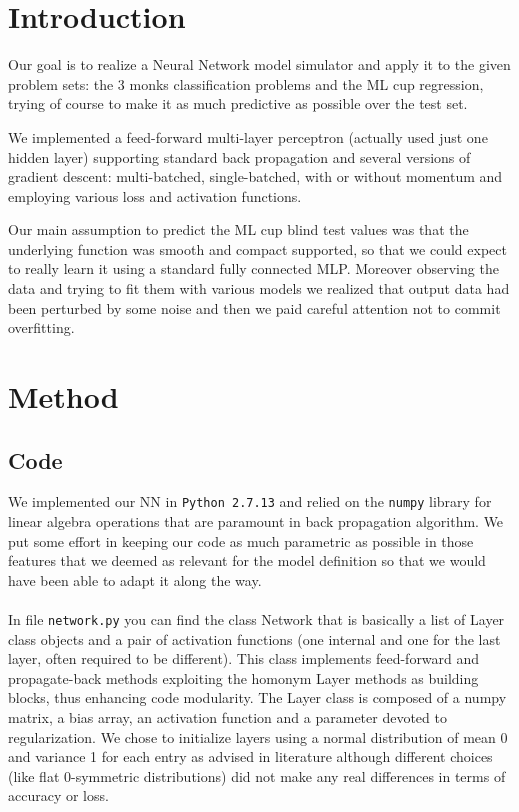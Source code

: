 \section{Introduction}

Our goal is to realize a Neural Network model simulator and apply it to the given problem sets: the 3 monks classification problems and the ML cup regression, trying of course to make it as much predictive as possible over the test set.

We implemented a feed-forward multi-layer perceptron (actually used just one hidden layer) supporting standard back propagation and several versions of gradient descent: multi-batched, single-batched, with or without momentum and employing various loss and activation functions.

Our main assumption to predict the ML cup blind test values was that the underlying function was smooth and compact supported, so that we could expect to really learn it using a standard fully connected MLP. Moreover observing the data and trying to fit them with various models we realized that output data had been perturbed by some noise and then we paid careful attention not to commit overfitting. 

\section{Method}

\subsection{Code}

We implemented our NN in \texttt{Python 2.7.13} and relied on the \texttt{numpy} library for linear algebra operations that are paramount in back propagation algorithm. We put some effort in keeping our code as much parametric as possible in those features that we deemed as relevant for the model definition so that we would have been able to adapt it along the way.

\paragraph{}
In file \texttt{network.py} you can find the class Network that is basically a list of Layer class objects and a pair of activation functions (one internal and one for the last layer, often required to be different). This class implements feed-forward and propagate-back methods exploiting the homonym Layer methods as building blocks, thus enhancing code modularity. The Layer class is composed of a numpy matrix, a bias array, an activation function and a parameter devoted to regularization. We chose to initialize layers using a normal distribution of mean 0 and variance 1 for each entry as advised in literature although different choices (like flat 0-symmetric distributions) did not make any real differences in terms of accuracy or loss.

